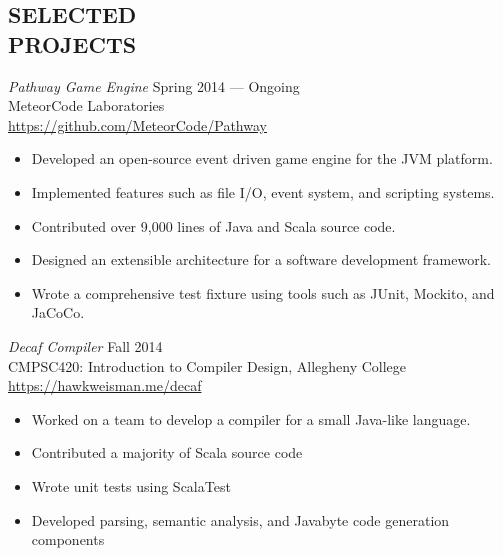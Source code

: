 \documentclass[margin]{res}
\begin{document}
\begin{resume}
                \pagebreak
\section{SELECTED \\ PROJECTS}
		{\sl Pathway Game Engine} \hfill Spring 2014 --- Ongoing \\
        		MeteorCode Laboratories \\ 
		\url{https://github.com/MeteorCode/Pathway}
		\begin{itemize} \itemsep -2pt %
		\item Developed an open-source event driven game engine for the JVM platform.
		\item Implemented features such as file I/O, event system, and scripting systems.
		\item Contributed over 9,000 lines of Java and Scala source code.
		\item Designed an extensible architecture for a software development framework.
		\item Wrote a comprehensive test fixture using tools such as JUnit, Mockito, and JaCoCo.
		\end{itemize}
		
		{\sl Decaf Compiler} \hfill Fall 2014 \\
        		CMPSC420: Introduction to Compiler Design, Allegheny College \\ 
		\url{https://hawkweisman.me/decaf}
		\begin{itemize} \itemsep -2pt %
		\item Worked on a team to develop a compiler for a small Java-like language.
		\item Contributed a majority of Scala source code
		\item Wrote unit tests using ScalaTest
		\item Developed parsing, semantic analysis, and Javabyte code generation components
		\end{itemize}
		

\end{resume}
\end{document}
